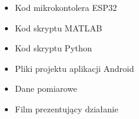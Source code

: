 \begin{itemize}
    \item Kod mikrokontolera ESP32
    \item Kod skryptu MATLAB
    \item Kod skryptu Python
    \item Pliki projektu aplikacji Android
    \item Dane pomiarowe
    \item Film prezentujący działanie
\end{itemize}